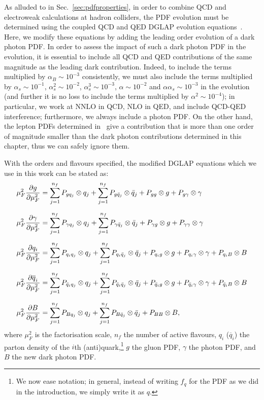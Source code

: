 \documentclass[withindex,glossary]{cam-thesis}
\begin{document}
As alluded to in Sec.~\ref{sec:pdfproperties}, in order to combine  QCD and electroweak
calculations at hadron colliders,
the PDF evolution must be determined using the coupled QCD and QED
DGLAP
evolution
equations~\cite{DeRujula:1979grv,Kripfganz:1988bd,Blumlein:1989gk}.
Here, we modify these equations by adding the leading order evolution of a dark photon PDF. 
%
In order to assess the impact of such a dark photon PDF in the
evolution, it is essential to include all QCD and QED contributions
of the same magnitude as the leading dark contribution. Indeed, to
include the terms multiplied by $\alpha_B \sim 10^{-3}$ consistently,
we must also include the terms multiplied by $\alpha_s \sim 10^{-1}$,
$\alpha_s^2 \sim 10^{-2}$, $\alpha_s^3 \sim 10^{-3}$, $\alpha \sim
10^{-2}$ and $\alpha\alpha_s \sim 10^{-3}$
in the evolution (and further it is no loss to include the terms
multiplied by $\alpha^2 \sim 10^{-4}$);
in particular, we work at NNLO in QCD, NLO in QED, and include QCD-QED
interference;
furthermore, we always include a photon PDF. On the other hand, the
lepton PDFs determined
in~\cite{Buonocore:2020erb,Buonocore:2020nai,Buonocore:2021bsf,Harland-Lang:2021zvr}
give a contribution that is more than one order of magnitude smaller
than the dark photon
contributions determined in this chapter, thus we can safely ignore them.


With the orders and flavours specified, the modified DGLAP equations which we use in this work can be stated as: 
%
\begin{align}
\label{eq:basicdglap}
\mu_F^2 \frac{\partial g}{\partial \mu_F^2} &= \sum_{j=1}^{n_f} P_{gq_j} \otimes q_j +\sum_{j=1}^{n_f} P_{g\bar{q}_j} \otimes \bar{q}_j + P_{gg}\otimes g + P_{g\gamma}\otimes \gamma \notag\\[1.5ex]
\mu_F^2 \frac{\partial \gamma}{\partial \mu_F^2} &= \sum_{j=1}^{n_f} P_{\gamma q_j} \otimes q_j +\sum_{j=1}^{n_f} P_{\gamma\bar{q}_j} \otimes \bar{q}_j + P_{\gamma g}\otimes g + P_{\gamma\gamma}\otimes\gamma\notag \\[1.5ex]
\mu_F^2 \frac{\partial q_i}{\partial \mu_F^2} &= \sum_{j=1}^{n_f} P_{q_iq_j} \otimes q_j +\sum_{j=1}^{n_f} P_{q_i\bar{q}_j} \otimes \bar{q}_j + P_{q_ig}\otimes g + P_{q_i\gamma}\otimes \gamma + P_{q_iB} \otimes B \\[1.5ex]
\mu_F^2 \frac{\partial \overline{q}_i}{\partial \mu_F^2} &= \sum_{j=1}^{n_f} P_{\bar{q}_iq_j} \otimes q_j +\sum_{j=1}^{n_f} P_{\bar{q}_i\bar{q}_j} \otimes \bar{q}_j + P_{\bar{q}_ig}\otimes g + P_{\bar{q}_i\gamma}\otimes \gamma + P_{\bar{q}_iB} \otimes B \notag\\[1.5ex]
\mu_F^2 \frac{\partial B}{\partial \mu_F^2} &= \sum_{j=1}^{n_f} P_{Bq_j} \otimes q_j +\sum_{j=1}^{n_f} P_{B\bar{q}_j} \otimes \bar{q}_j + P_{BB}\otimes B,\notag
\end{align}
%
where $\mu_F^2$ is the factorisation scale, $n_f$ the number of active
flavours, $q_i$ ($\overline{q}_i$) the parton density of the $i$th (anti)quark,\footnote{We now ease notation; in general, instead of writing $f_q$ for the PDF as we did in the introduction, we simply write it as $q$.} $g$ the gluon PDF, $\gamma$ the photon PDF, and
$B$ the new dark photon PDF.
\end{document}
